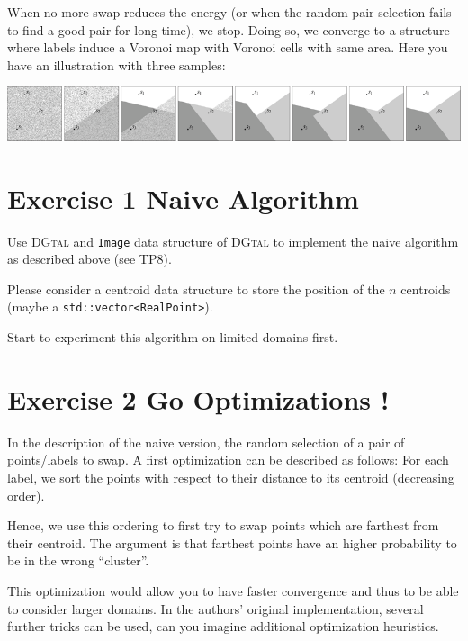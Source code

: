 \documentclass[a4paper, 11pt]{article}
\begin{document}
When no more swap reduces the energy (or when the random pair
selection fails to find a good pair for long time), we
stop. Doing so, we converge to a structure where labels induce a
Voronoi map with Voronoi cells with same area.  Here you have an
illustration with three samples:

\begin{center}
  \includegraphics[width=16cm]{teaser}
\end{center}




\section*{Exercise 1 \rm Naive Algorithm}

 Use \textsc{DGtal} and \texttt{Image} data structure of
 \textsc{DGtal} to implement the naive algorithm as described above
 (see TP8).

Please consider a centroid data structure to store the position of the
$n$ centroids (maybe a \texttt{std::vector<RealPoint>}).

Start to experiment this algorithm on limited domains first.


\section*{Exercise 2 \rm Go Optimizations !}

In the description of the naive version, the random selection of a
pair of points/labels to swap. A first optimization can be described
as follows: For each label, we sort the points with respect to their
distance to its centroid (decreasing order).

Hence, we use this ordering to first try to swap points which are
farthest from their centroid. The argument is that farthest points
have an higher probability to be in the wrong ``cluster''.

This optimization would allow you to have faster convergence and thus
to be able to consider larger domains. In the authors' original
implementation,  several further tricks can be used, can you imagine
additional optimization heuristics.



\end{document}
